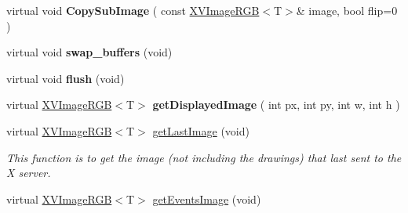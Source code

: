 \begin{CompactItemize}
\item 
\label{XVRemoteWindowX_a13}
\hypertarget{class_XVRemoteWindowX_a13}{
virtual void {\bf Copy\-Sub\-Image} ( const \hyperlink{class_XVImageRGB}{XVImage\-RGB}$<$T$>$\& image, bool flip=0 )}

\item 
\label{XVRemoteWindowX_a14}
\hypertarget{class_XVRemoteWindowX_a14}{
virtual void {\bf swap\_\-buffers} (void)}

\item 
\label{XVRemoteWindowX_a15}
\hypertarget{class_XVRemoteWindowX_a15}{
virtual void {\bf flush} (void)}

\item 
\label{XVRemoteWindowX_a16}
\hypertarget{class_XVRemoteWindowX_a16}{
virtual \hyperlink{class_XVImageRGB}{XVImage\-RGB}$<$T$>$ {\bf get\-Displayed\-Image} ( int px, int py, int w, int h )}

\item 
\label{XVRemoteWindowX_a17}
\hypertarget{class_XVRemoteWindowX_a17}{
virtual \hyperlink{class_XVImageRGB}{XVImage\-RGB}$<$T$>$ \hyperlink{class_XVRemoteWindowX_a17}{get\-Last\-Image} (void)}

\begin{CompactList}\small\item\em This function is to get the image (not including the drawings) that last sent to the X server.\item\end{CompactList}\item 
\label{XVRemoteWindowX_a18}
\hypertarget{class_XVRemoteWindowX_a18}{
virtual \hyperlink{class_XVImageRGB}{XVImage\-RGB}$<$T$>$ \hyperlink{class_XVRemoteWindowX_a18}{get\-Events\-Image} (void)}


\end{CompactItemize}
